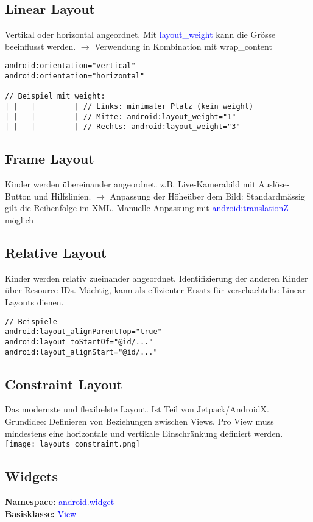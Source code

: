 \subsection{Linear Layout}
Vertikal oder horizontal angeordnet. Mit \textcolor{blue}{layout\_weight} kann die Grösse beeinflusst werden. $\rightarrow$ Verwendung in Kombination mit wrap\_content
\begin{lstlisting}
android:orientation="vertical"
android:orientation="horizontal"

// Beispiel mit weight:
| |   |         | // Links: minimaler Platz (kein weight)
| |   |         | // Mitte: android:layout_weight="1"
| |   |         | // Rechts: android:layout_weight="3"
\end{lstlisting}
\subsection{Frame Layout}
Kinder werden übereinander angeordnet. z.B. Live-Kamerabild mit Auslöse-Button und Hilfslinien. $\rightarrow$ Anpassung der \dq Höhe\dq über dem Bild: Standardmässig gilt die Reihenfolge im XML. Manuelle Anpassung mit \textcolor{blue}{android:translationZ} möglich
\subsection{Relative Layout}
Kinder werden relativ zueinander angeordnet. Identifizierung der anderen Kinder über Resource IDs. Mächtig, kann als effizienter Ersatz für verschachtelte Linear Layouts dienen.
\begin{lstlisting}
// Beispiele
android:layout_alignParentTop="true"
android:layout_toStartOf="@id/..."
android:layout_alignStart="@id/..."
\end{lstlisting}
\subsection{Constraint Layout}
Das modernste und flexibelste Layout. Ist Teil von Jetpack/AndroidX. Grundidee: Definieren von Beziehungen zwischen Views. Pro View muss mindestens eine horizontale und vertikale Einschränkung definiert werden.\\
\texttt{[image: layouts\_constraint.png]}
\subsection{Widgets}
\textbf{Namespace:} \textcolor{blue}{android.widget}\\
\textbf{Basisklasse:} \textcolor{blue}{View}
